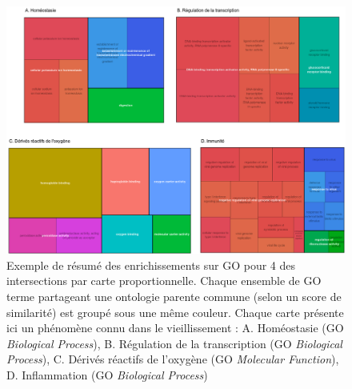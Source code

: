 \begin{figure}[ht]
    \centering
    \includegraphics[width=1\textwidth]{img/chap2/chap2_revigo_resume_4_enrich.png}
    \caption[Exemple de résumé des enrichissements sur GO pour 4 des intersections par carte proportionnelle]{Exemple de résumé des enrichissements sur GO pour 4 des intersections par carte proportionnelle. Chaque ensemble de GO terme partageant une ontologie parente commune (selon un score de similarité) est groupé sous une même couleur. Chaque carte présente ici un phénomène connu dans le vieillissement : A. Homéostasie (GO \textit{Biological Process}), B. Régulation de la transcription (GO \textit{Biological Process}), C. Dérivés réactifs de l'oxygène (GO \textit{Molecular Function}), D. Inflammation (GO \textit{Biological Process}) }
    \label{figure:revigo_resume_4_enrich}
\end{figure}

